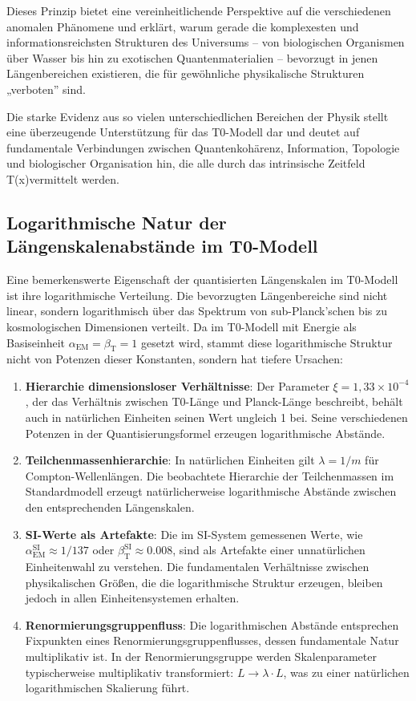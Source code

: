 \documentclass[12pt,a4paper]{article}
\newcommand{\Tfield}{T(x)}
\newcommand{\alphaEM}{\alpha_{\text{EM}}}
\newcommand{\betaT}{\beta_{\text{T}}}
\begin{document}
	Dieses Prinzip bietet eine vereinheitlichende Perspektive auf die verschiedenen anomalen Phänomene und erklärt, warum gerade die komplexesten und informationsreichsten Strukturen des Universums – von biologischen Organismen über Wasser bis hin zu exotischen Quantenmaterialien – bevorzugt in jenen Längenbereichen existieren, die für gewöhnliche physikalische Strukturen „verboten'' sind.
	
	Die starke Evidenz aus so vielen unterschiedlichen Bereichen der Physik stellt eine überzeugende Unterstützung für das T0-Modell dar und deutet auf fundamentale Verbindungen zwischen Quantenkohärenz, Information, Topologie und biologischer Organisation hin, die alle durch das intrinsische Zeitfeld \Tfield vermittelt werden.

\subsection{Logarithmische Natur der Längenskalenabstände im T0-Modell}

Eine bemerkenswerte Eigenschaft der quantisierten Längenskalen im T0-Modell ist ihre logarithmische Verteilung. Die bevorzugten Längenbereiche sind nicht linear, sondern logarithmisch über das Spektrum von sub-Planck'schen bis zu kosmologischen Dimensionen verteilt. Da im T0-Modell mit Energie als Basiseinheit $\alphaEM = \betaT = 1$ gesetzt wird, stammt diese logarithmische Struktur nicht von Potenzen dieser Konstanten, sondern hat tiefere Ursachen:

\begin{enumerate}
	\item \textbf{Hierarchie dimensionsloser Verhältnisse}: Der Parameter $\xi = 1{,}33 \times 10^{-4}$, der das Verhältnis zwischen T0-Länge und Planck-Länge beschreibt, behält auch in natürlichen Einheiten seinen Wert ungleich 1 bei. Seine verschiedenen Potenzen in der Quantisierungsformel erzeugen logarithmische Abstände.
	
	\item \textbf{Teilchenmassenhierarchie}: In natürlichen Einheiten gilt $\lambda = 1/m$ für \\Compton-Wellenlängen. Die beobachtete Hierarchie der Teilchenmassen im Standardmodell erzeugt natürlicherweise logarithmische Abstände zwischen den entsprechenden Längenskalen.
	
	\item \textbf{SI-Werte als Artefakte}: Die im SI-System gemessenen Werte, wie $\alphaEM^{\text{SI}} \approx 1/137$ oder $\betaT^{\text{SI}} \approx 0.008$, sind als Artefakte einer unnatürlichen Einheitenwahl zu verstehen. Die fundamentalen Verhältnisse zwischen physikalischen Größen, die die logarithmische Struktur erzeugen, bleiben jedoch in allen Einheitensystemen erhalten.
	
	\item \textbf{Renormierungsgruppenfluss}: Die logarithmischen Abstände entsprechen Fixpunkten eines Renormierungsgruppenflusses, dessen fundamentale Natur multiplikativ ist. In der Renormierungsgruppe werden Skalenparameter typischerweise multiplikativ transformiert: $L \to \lambda \cdot L$, was zu einer natürlichen logarithmischen Skalierung führt.
\end{enumerate}
\end{document}
